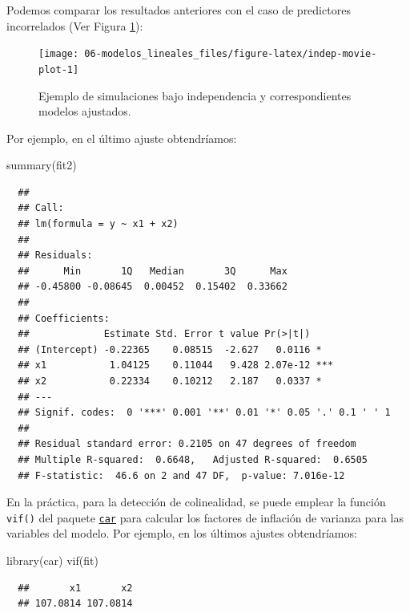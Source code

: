 \documentclass[
]{book}
\newenvironment{Shaded}{\begin{snugshade}}{\end{snugshade}}
\newcommand{\FunctionTok}[1]{\textcolor[rgb]{0.00,0.00,0.00}{#1}}
\newcommand{\NormalTok}[1]{#1}
\theoremstyle{break}
\theoremstyle{nonumberplain}
\begin{document}
Podemos comparar los resultados anteriores con el caso de predictores incorrelados (Ver Figura \ref{fig:indep-movie-plot}):

\begin{figure}[!htb]

{\centering \texttt{[image: 06-modelos\_lineales\_files/figure-latex/indep-movie-plot-1]} 

}

\caption{Ejemplo de simulaciones bajo independencia y correspondientes modelos ajustados.}\label{fig:indep-movie-plot}
\end{figure}

Por ejemplo, en el último ajuste obtendríamos:

\begin{Shaded}
\begin{Highlighting}[]
\FunctionTok{summary}\NormalTok{(fit2)}
\end{Highlighting}
\end{Shaded}

\begin{verbatim}
  ## 
  ## Call:
  ## lm(formula = y ~ x1 + x2)
  ## 
  ## Residuals:
  ##      Min       1Q   Median       3Q      Max 
  ## -0.45800 -0.08645  0.00452  0.15402  0.33662 
  ## 
  ## Coefficients:
  ##             Estimate Std. Error t value Pr(>|t|)    
  ## (Intercept) -0.22365    0.08515  -2.627   0.0116 *  
  ## x1           1.04125    0.11044   9.428 2.07e-12 ***
  ## x2           0.22334    0.10212   2.187   0.0337 *  
  ## ---
  ## Signif. codes:  0 '***' 0.001 '**' 0.01 '*' 0.05 '.' 0.1 ' ' 1
  ## 
  ## Residual standard error: 0.2105 on 47 degrees of freedom
  ## Multiple R-squared:  0.6648,   Adjusted R-squared:  0.6505 
  ## F-statistic:  46.6 on 2 and 47 DF,  p-value: 7.016e-12
\end{verbatim}

En la práctica, para la detección de colinealidad, se puede emplear la función
\texttt{vif()} del paquete \href{https://CRAN.R-project.org/package=car}{\texttt{car}} para calcular los factores de inflación de varianza para las variables del modelo.
Por ejemplo, en los últimos ajustes obtendríamos:

\begin{Shaded}
\begin{Highlighting}[]
\FunctionTok{library}\NormalTok{(car)}
\FunctionTok{vif}\NormalTok{(fit)}
\end{Highlighting}
\end{Shaded}

\begin{verbatim}
  ##       x1       x2 
  ## 107.0814 107.0814
\end{verbatim}
\end{document}
